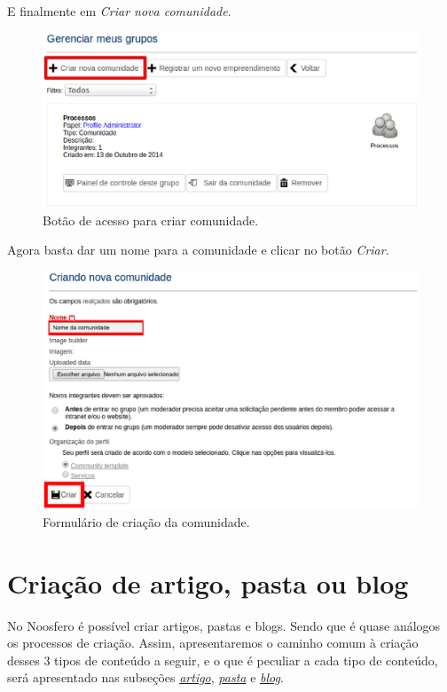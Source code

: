 E finalmente em \emph{\color{red}Criar nova comunidade}.

\begin{figure}[H]
  \centering
    \includegraphics[keepaspectratio=true,scale=0.49]{figuras/gerenciarGrupos.eps}
  \caption{Botão de acesso para criar comunidade.}
  \label{fig:botaoAcesso}
\end{figure}

\newpage
Agora basta dar um nome para a comunidade e clicar no botão \emph{\color{red}Criar}.

\begin{figure}[H]
  \centering
    \includegraphics[keepaspectratio=true,scale=0.49]{figuras/criandoComunidade.eps}
  \caption{Formulário de criação da comunidade.}
  \label{fig:criandoComunidade}
\end{figure}

\section{Criação de artigo, pasta ou blog}
\label{sec:criarConteudo}

No Noosfero é possível criar artigos, pastas e blogs. Sendo que é quase análogos os processos de criação. Assim, apresentaremos o caminho comum à criação desses 3 tipos de conteúdo a seguir, e o que é peculiar a cada tipo de conteúdo, será apresentado nas subseções \emph{\hyperref[subsec:artigo]{artigo}}, \emph{\hyperref[subsec:pasta]{pasta}} e \emph{\hyperref[subsec:blog]{blog}}.

